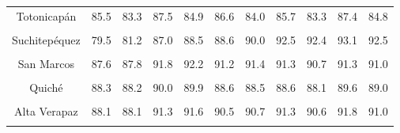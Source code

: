{\begin{tabular}[t]{ccccccccccc}
Totonicapán & 85.5 & 83.3 & 87.5 & 84.9 & 86.6 & 84.0 & 85.7 & 83.3 & 87.4 & 84.8\\
\cellcolor[HTML]{B6B3FF}{Quetzaltenango} & \cellcolor[HTML]{B6B3FF}{90.6} & \cellcolor[HTML]{B6B3FF}{92.3} & \cellcolor[HTML]{B6B3FF}{96.6} & \cellcolor[HTML]{B6B3FF}{97.8} & \cellcolor[HTML]{B6B3FF}{95.9} & \cellcolor[HTML]{B6B3FF}{96.5} & \cellcolor[HTML]{B6B3FF}{94.2} & \cellcolor[HTML]{B6B3FF}{94.0} & \cellcolor[HTML]{B6B3FF}{92.1} & \cellcolor[HTML]{B6B3FF}{92.4}\\
Suchitepéquez & 79.5 & 81.2 & 87.0 & 88.5 & 88.6 & 90.0 & 92.5 & 92.4 & 93.1 & 92.5\\
\cellcolor[HTML]{B6B3FF}{Retalhuleu} & \cellcolor[HTML]{B6B3FF}{88.3} & \cellcolor[HTML]{B6B3FF}{86.5} & \cellcolor[HTML]{B6B3FF}{95.1} & \cellcolor[HTML]{B6B3FF}{94.4} & \cellcolor[HTML]{B6B3FF}{93.8} & \cellcolor[HTML]{B6B3FF}{91.6} & \cellcolor[HTML]{B6B3FF}{93.7} & \cellcolor[HTML]{B6B3FF}{91.3} & \cellcolor[HTML]{B6B3FF}{91.2} & \cellcolor[HTML]{B6B3FF}{89.1}\\
San Marcos & 87.6 & 87.8 & 91.8 & 92.2 & 91.2 & 91.4 & 91.3 & 90.7 & 91.3 & 91.0\\
\cellcolor[HTML]{B6B3FF}{Huehuetenango} & \cellcolor[HTML]{B6B3FF}{86.8} & \cellcolor[HTML]{B6B3FF}{85.7} & \cellcolor[HTML]{B6B3FF}{88.1} & \cellcolor[HTML]{B6B3FF}{86.3} & \cellcolor[HTML]{B6B3FF}{87.2} & \cellcolor[HTML]{B6B3FF}{84.5} & \cellcolor[HTML]{B6B3FF}{86.5} & \cellcolor[HTML]{B6B3FF}{83.1} & \cellcolor[HTML]{B6B3FF}{87.5} & \cellcolor[HTML]{B6B3FF}{84.5}\\
Quiché & 88.3 & 88.2 & 90.0 & 89.9 & 88.6 & 88.5 & 88.6 & 88.1 & 89.6 & 89.0\\
\cellcolor[HTML]{B6B3FF}{Baja Verapaz} & \cellcolor[HTML]{B6B3FF}{84.8} & \cellcolor[HTML]{B6B3FF}{85.4} & \cellcolor[HTML]{B6B3FF}{89.0} & \cellcolor[HTML]{B6B3FF}{89.7} & \cellcolor[HTML]{B6B3FF}{85.6} & \cellcolor[HTML]{B6B3FF}{86.6} & \cellcolor[HTML]{B6B3FF}{85.6} & \cellcolor[HTML]{B6B3FF}{86.2} & \cellcolor[HTML]{B6B3FF}{85.1} & \cellcolor[HTML]{B6B3FF}{86.5}\\
Alta Verapaz & 88.1 & 88.1 & 91.3 & 91.6 & 90.5 & 90.7 & 91.3 & 90.6 & 91.8 & 91.0\\
\cellcolor[HTML]{B6B3FF}{Petén} & \cellcolor[HTML]{B6B3FF}{89.8} & \cellcolor[HTML]{B6B3FF}{89.7} & \cellcolor[HTML]{B6B3FF}{99.5} & \cellcolor[HTML]{B6B3FF}{99.1} & \cellcolor[HTML]{B6B3FF}{95.7} & \cellcolor[HTML]{B6B3FF}{95.2} & \cellcolor[HTML]{B6B3FF}{93.0} & \cellcolor[HTML]{B6B3FF}{91.6} & \cellcolor[HTML]{B6B3FF}{92.7} & \cellcolor[HTML]{B6B3FF}{91.3}\\

\end{tabular}}
